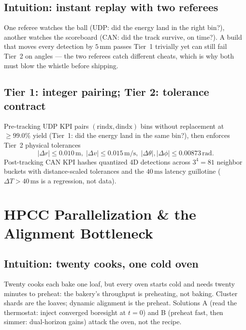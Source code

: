 \documentclass[11pt,oneside]{book}
\begin{document}
\section{Intuition: instant replay with two referees}
\label{sec:referees}

One referee watches the ball (UDP: did the energy land in the right bin?),
another watches the scoreboard (CAN: did the track survive, on time?).
A build that moves every detection by $5\,\mathrm{mm}$ passes Tier~1
trivially yet can still fail Tier~2 on angles --- the two referees catch
different cheats, which is why both must blow the whistle before shipping.

\section{Tier 1: integer pairing; Tier 2: tolerance contract}
\label{sec:udp-kpi}

Pre-tracking UDP KPI pairs $(\mathrm{rindx},\mathrm{dindx})$ bins without
replacement at $\ge99.0\%$ yield (Tier~1: did the energy land in the same
bin?), then enforces Tier~2 physical tolerances
\begin{equation}
\boxed{|\Delta r|\le0.010\,\mathrm{m},\;|\Delta v|\le0.015\,\mathrm{m/s},\;
|\Delta\theta|,|\Delta\phi|\le0.00873\,\mathrm{rad}.}
\label{eq:tier2}
\end{equation}
Post-tracking CAN KPI hashes quantized 4D detections across $3^4=81$
neighbor buckets with distance-scaled tolerances and the $40\,\mathrm{ms}$
latency guillotine ($\Delta T>40\,\mathrm{ms}$ is a regression, not data).

\chapter{HPCC Parallelization \& the Alignment Bottleneck}
\label{ch:hpcc}

\section{Intuition: twenty cooks, one cold oven}
\label{sec:cooks}

Twenty cooks each bake one loaf, but every oven starts cold and needs
twenty minutes to preheat: the bakery's throughput is preheating, not
baking. Cluster shards are the loaves; dynamic alignment is the preheat.
Solutions A (read the thermostat: inject converged boresight at $t=0$) and
B (preheat fast, then simmer: dual-horizon gains) attack the oven, not the
recipe.
\end{document}
